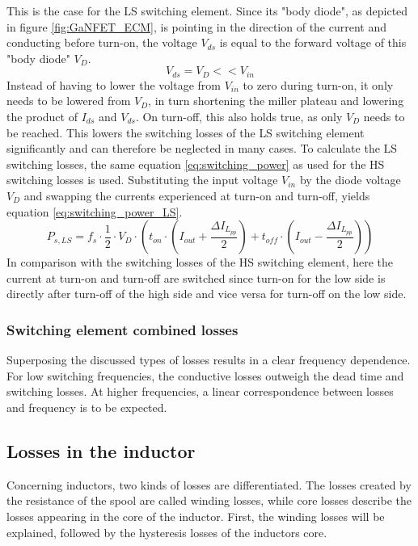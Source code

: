 This is the case for the \ac{LS} switching element. Since its "body diode", as depicted in figure \ref{fig:GaNFET_ECM}, is pointing in the direction of the current and conducting before turn-on, the voltage $V_{ds}$ is equal to the forward voltage of this "body diode" $V_D$.
\begin{equation}
    V_{ds} = V_D << V_{in}
\end{equation}
Instead of having to lower the voltage from $V_{in}$ to zero during turn-on, it only needs to be lowered from $V_D$, in turn shortening the miller plateau and lowering the product of $I_{ds}$ and $V_{ds}$.
On turn-off, this also holds true, as only $V_D$ needs to be reached. This lowers the switching losses of the \ac{LS} switching element significantly and can therefore be neglected in many cases. To calculate the \ac{LS} switching losses, the same equation \ref{eq:switching_power} as used for the \ac{HS} switching losses is used. Substituting the input voltage $V_{in}$ by the diode voltage $V_D$ and swapping the currents experienced at turn-on and turn-off, yields equation \ref{eq:switching_power_LS}.
\begin{equation}\label{eq:switching_power_LS}
    P_{s,LS} = f_s \cdot \frac{1}{2} \cdot V_D \cdot (t_{on} \cdot (I_{out} + \frac{\Delta I_{L_{pp}}}{2}) + t_{off} \cdot (I_{out} - \frac{\Delta I_{L_{pp}}}{2}))    
\end{equation}
In comparison with the switching losses of the \ac{HS} switching element, here the current at turn-on and turn-off are switched since turn-on for the low side is directly after turn-off of the high side and vice versa for turn-off on the low side.
\subsubsection{Switching element combined losses}
Superposing the discussed types of losses results in a clear frequency dependence. For low switching frequencies, the conductive losses outweigh the dead time and switching losses. At higher frequencies, a linear correspondence between losses and frequency is to be expected. 

\subsection{Losses in the inductor} \label{sec:losses_in_the_inductor}
Concerning inductors, two kinds of losses are differentiated. The losses created by the resistance of the spool are called winding losses, while core losses describe the losses appearing in the core of the inductor. First, the winding losses will be explained, followed by the hysteresis losses of the inductors core.

